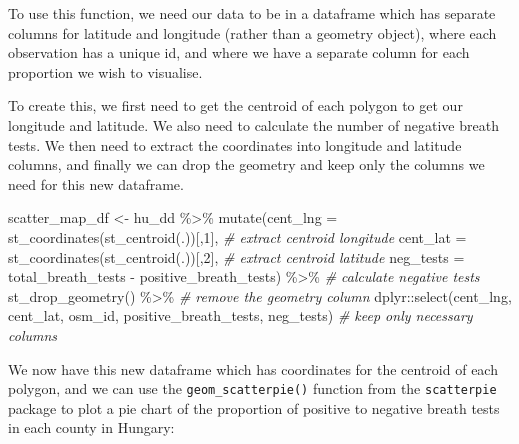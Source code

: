 \documentclass[
]{book}
\newenvironment{Shaded}{\begin{snugshade}}{\end{snugshade}}
\newcommand{\AttributeTok}[1]{\textcolor[rgb]{0.77,0.63,0.00}{#1}}
\newcommand{\CommentTok}[1]{\textcolor[rgb]{0.56,0.35,0.01}{\textit{#1}}}
\newcommand{\DecValTok}[1]{\textcolor[rgb]{0.00,0.00,0.81}{#1}}
\newcommand{\FunctionTok}[1]{\textcolor[rgb]{0.00,0.00,0.00}{#1}}
\newcommand{\NormalTok}[1]{#1}
\newcommand{\OtherTok}[1]{\textcolor[rgb]{0.56,0.35,0.01}{#1}}
\newcommand{\SpecialCharTok}[1]{\textcolor[rgb]{0.00,0.00,0.00}{#1}}
\begin{document}
To use this function, we need our data to be in a dataframe which has separate columns for latitude and longitude (rather than a geometry object), where each observation has a unique id, and where we have a separate column for each proportion we wish to visualise.

To create this, we first need to get the centroid of each polygon to get our longitude and latitude. We also need to calculate the number of negative breath tests. We then need to extract the coordinates into longitude and latitude columns, and finally we can drop the geometry and keep only the columns we need for this new dataframe.

\begin{Shaded}
\begin{Highlighting}[]
\NormalTok{scatter\_map\_df }\OtherTok{\textless{}{-}}\NormalTok{ hu\_dd }\SpecialCharTok{\%\textgreater{}\%} 
  \FunctionTok{mutate}\NormalTok{(}\AttributeTok{cent\_lng =} \FunctionTok{st\_coordinates}\NormalTok{(}\FunctionTok{st\_centroid}\NormalTok{(.))[,}\DecValTok{1}\NormalTok{],    }\CommentTok{\# extract centroid longitude}
         \AttributeTok{cent\_lat =} \FunctionTok{st\_coordinates}\NormalTok{(}\FunctionTok{st\_centroid}\NormalTok{(.))[,}\DecValTok{2}\NormalTok{],    }\CommentTok{\# extract centroid latitude}
         \AttributeTok{neg\_tests =}\NormalTok{ total\_breath\_tests }\SpecialCharTok{{-}}\NormalTok{ positive\_breath\_tests) }\SpecialCharTok{\%\textgreater{}\%}     \CommentTok{\# calculate negative tests}
  \FunctionTok{st\_drop\_geometry}\NormalTok{() }\SpecialCharTok{\%\textgreater{}\%}       \CommentTok{\# remove the geometry column}
\NormalTok{  dplyr}\SpecialCharTok{::}\FunctionTok{select}\NormalTok{(cent\_lng, cent\_lat, osm\_id, positive\_breath\_tests, neg\_tests)   }\CommentTok{\# keep only necessary columns}
\end{Highlighting}
\end{Shaded}

We now have this new dataframe which has coordinates for the centroid of each polygon, and we can use the \texttt{geom\_scatterpie()} function from the \texttt{scatterpie} package to plot a pie chart of the proportion of positive to negative breath tests in each county in Hungary:
\end{document}

